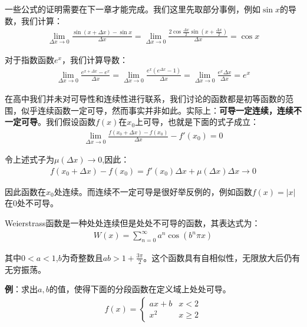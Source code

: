 \documentclass{ctexart}
\let\oldtextbf\textbf %
\renewcommand{\textbf}[1]{\textcolor{btex}{\oldtextbf{#1}}} %
\begin{document}
一些公式的证明需要在下一章才能完成。我们这里先取部分事例，例如$\sin x$的导数，我们计算：
\begin{align*}
    \lim_{\Delta x\to 0}\frac{\sin(x+\Delta x)-\sin x}{\Delta x} =\lim_{\Delta x\to 0}\frac{2\cos\frac{\Delta x}{2}
\sin (x+\frac{\Delta x}{2}) }{\Delta x}  =\cos x
\end{align*}

对于指数函数$e^x$，我们计算导数：
    \begin{align*}
    \lim_{\Delta x\to 0}\frac{e^{x+\Delta x}-e^x}{\Delta x}=\lim_{\Delta x\to 0}\frac
{e^x(e^{\Delta x}-1)}{\Delta x}=  \lim_{\Delta x\to 0}\frac
{e^x\Delta x}{\Delta x}=e^x
\end{align*}

在高中我们并未对可导性和连续性进行联系，我们讨论的函数都是初等函数的范围，似乎连续函数一定可导，然而事实并非如此。实际上：\textbf{可导一定连续，连续不一定可导}。我们假设函数$f(x)$在$x_0$上可导，也就是下面的式子成立：
\begin{align*}
    \lim_{\Delta x\to 0}\frac{f(x_0+\Delta x)-f(x_0)}{\Delta x}-f'(x_0)=0
\end{align*}

令上述式子为$\mu(\Delta x)\to 0$,因此：
\begin{align*}
    f(x_0+\Delta x)-f(x_0)=f'(x_0)\Delta x+\mu(\Delta x)\Delta x\to 0
\end{align*}

因此函数在$x_0$处连续。而连续不一定可导是很好举反例的，例如函数$f(x)=|x|$在0处不可导。
\begin{tcolorbox}[
    colback=bac1,     %
    colframe=fra1,   %
    coltitle=white,             %
    coltext=tex1,
    title=威尔斯特拉斯函数,
    fonttitle=\bfseries,        %
arc=3mm,                     %
breakable
]
Weierstrass函数是一种处处连续但是处处不可导的函数，其表达式为：
\begin{align*}
    W(x)=\sum_{n=0}^\infty  a^n\cos(b^n\pi x)
\end{align*}

其中$0<a<1$,$b$为奇整数且$ab>1+\frac{3\pi}{2}$。这个函数具有自相似性，无限放大后仍有无穷振荡。
\end{tcolorbox}

\textbf{例}：求出$a,b$的值，使得下面的分段函数在定义域上处处可导。
\begin{align*}
    f(x)=\begin{cases}
        ax+b & x<2\\
        x^2 & x\geq 2
    \end{cases}
\end{align*}
\end{document}
